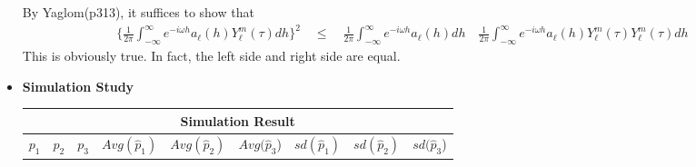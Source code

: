 \documentclass[11pt]{article}
\begin{document}
\begin{itemize}
By Yaglom(p313), it suffices to show that\\
\begin{align*}
\biggl\{ \frac{1}{2\pi} \int_{-\infty}^{\infty} e^{-i \omega h}a_\ell(h) Y_{\ell}^m(\tau) dh \biggl\}^2 \quad \le \quad \frac{1}{2\pi} \int_{-\infty}^{\infty} e^{-i \omega h}a_\ell(h) dh \quad \frac{1}{2\pi} \int_{-\infty}^{\infty} e^{-i \omega h}a_\ell(h) Y_{\ell}^m(\tau) Y_{\ell}^m(\tau) dh 
\end{align*}
This is obviously true. In fact, the left side and right side are equal.\\

\pagebreak

\item \textbf{Simulation Study}\\

\begin{table}[h!]
\centering
\begin{tabular}{ |p{1cm}|p{1cm}|p{1cm}||p{1.5cm}|p{1.5cm}|p{1.5cm}||p{1.5cm}|p{1.5cm}|p{1.5cm}|}
 \hline
 \multicolumn{9}{|c|}{Simulation Result} \\
 \hline
 $p_1$ & $p_2$ & $p_3$ & $Avg(\hat{p}_1)$ & $Avg(\hat{p}_2)$  & $Avg(\hat{p}_3$)& $sd(\hat{p}_1)$ & $sd(\hat{p}_2)$  & $sd(\hat{p}_3$)\\
 \hline


\end{tabular}
\end{table}
\end{itemize}
\end{document}
